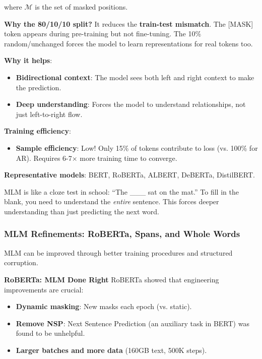 \documentclass{article}
\begin{document}
where $\mathcal{M}$ is the set of masked positions.

\textbf{Why the 80/10/10 split?} It reduces the \textbf{train-test mismatch}. The [MASK] token appears during pre-training but not fine-tuning. The 10\% random/unchanged forces the model to learn representations for real tokens too.

\textbf{Why it helps}:

\begin{itemize}
\item \textbf{Bidirectional context}: The model sees both left and right context to make the prediction.
\item \textbf{Deep understanding}: Forces the model to understand relationships, not just left-to-right flow.
\end{itemize}

\textbf{Training efficiency}:

\begin{itemize}
\item \textbf{Sample efficiency}: Low! Only 15\% of tokens contribute to loss (vs. 100\% for AR). Requires 6-7$\times$ more training time to converge.
\end{itemize}

\textbf{Representative models}: BERT, RoBERTa, ALBERT, DeBERTa, DistilBERT.

\begin{tcolorbox}[colback=yellow!5!white, colframe=orange!50!black, title=Intuition: The Fill-in-the-Blank Test]
MLM is like a cloze test in school: ``The \_\_\_ sat on the mat.'' To fill in the blank, you need to understand the \textit{entire} sentence. This forces deeper understanding than just predicting the next word.
\end{tcolorbox}

\subsubsection{MLM Refinements: RoBERTa, Spans, and Whole Words}

MLM can be improved through better training procedures and structured corruption.

\textbf{RoBERTa: MLM Done Right}
RoBERTa showed that engineering improvements are crucial:
\begin{itemize}
\item \textbf{Dynamic masking}: New masks each epoch (vs. static).
\item \textbf{Remove NSP}: Next Sentence Prediction (an auxiliary task in BERT) was found to be unhelpful.
\item \textbf{Larger batches and more data} (160GB text, 500K steps).
\end{itemize}
\end{document}
